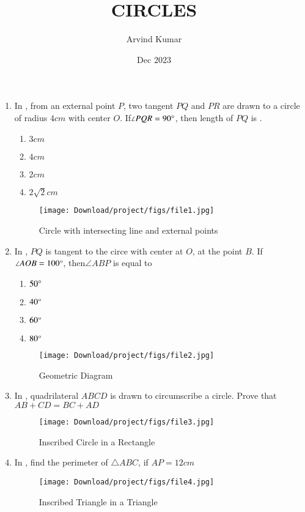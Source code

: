 \documentclass[12pt,-letter paper]{article}
\title{CIRCLES}
\author{Arvind Kumar}
\date{Dec 2023}
\begin{document}
\maketitle
\begin{enumerate}
	\item In , from an external point $P$, two tangent $PQ$ and $PR$ are drawn to a circle of radius $4cm$ with center $O$. If$\angle{PQR}=90\degree$, then length of $PQ$ is \underline {\hspace{4cm}}.
\begin{enumerate}[label=(\alph*)]
\item $3cm$ 
\item $4cm$
\item $2cm$
\item $2{\sqrt{2}}cm$ 
\end{enumerate}
\begin{figure}[H]
\centering
\texttt{[image: Download/project/figs/file1.jpg]}
\caption{Circle with intersecting line and external points}
\label{fig:Figure1}
\end{figure}
\item In , $PQ$ is tangent to the circe with center at $O$, at the point $B$. If$\angle{AOB}=100\degree$, then$\angle{ABP}$ is equal to\newline
\begin{enumerate}[label=(\alph*)] 
\item $50\degree$ 
\item $40\degree$ 
\item $60\degree$ 
\item $80\degree$
\end{enumerate}
\begin{figure}[H]
\centering
\texttt{[image: Download/project/figs/file2.jpg]}
\caption{Geometric Diagram}
\label{fig:Figure2}
\end{figure}
\item In , quadrilateral $ABCD$ is drawn to circumscribe a circle. Prove that\newline
$AB+CD=BC+AD$
\begin{figure}[H]
\centering
\texttt{[image: Download/project/figs/file3.jpg]}
\caption{Inscribed Circle in a Rectangle}
\label{fig:Figure3}
\end{figure}
\item In , find the perimeter of $\triangle ABC$, if $AP=12cm$
\begin{figure}[H]
\centering
\texttt{[image: Download/project/figs/file4.jpg]}
\caption{Inscribed Triangle in a Triangle}                                                   
\label{fig:Figure4}
\end{figure}
\end{enumerate}
\end{document}
